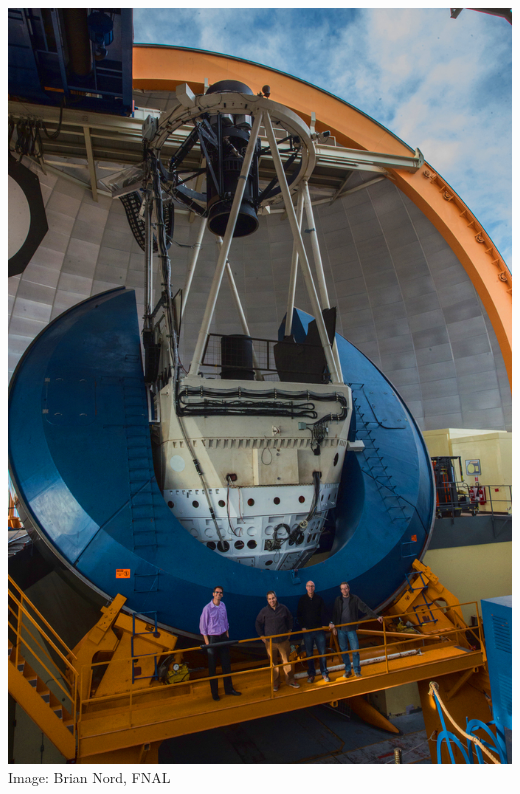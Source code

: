 \documentclass{beamer}
\begin{document}
{\begin{columns}
        \begin{column}{0.5\textwidth}
            \includegraphics[scale=0.17]{ctio_blanco_crew_2013Oct-30-small-balance.jpg}
            \newline
            {\tiny Image: Brian Nord, FNAL}
        \end{column}

    \end{columns}

}
\end{document}
